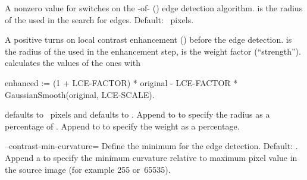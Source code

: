 \begin{codelist}
  \label{opt:contrast-edge-scale}%
\item[\itempar{--contrast-edge-scale=\metavar{EDGE-SCALE}\optional{:\feasiblebreak
      \metavar{LCE-SCALE}:\feasiblebreak\metavar{LCE-FACTOR}}}]\itemend
  A nonzero value for  switches on the
  \hyp{}of\hyp{} () edge detection
  algorithm.   is the radius of the  used in the search
  for edges.  Default: ~pixels.

  A positive  turns on local contrast enhancement () before the
   edge detection.   is the radius of the 
  used in the enhancement step,  is the weight factor (``strength'').
  \App{} calculates the  values of the  ones with

  \begin{adalisting}
enhanced :=
    (1 + LCE-FACTOR) * original -
    LCE-FACTOR * GaussianSmooth(original,
                                LCE-SCALE).
  \end{adalisting}

   defaults to ~pixels and 
  defaults to .  Append \sample{\%} to  to
  specify the radius as a percentage of .  Append \sample{\%} to
   to specify the weight as a percentage.


  \label{opt:contrast-min-curvature}%
\item[--contrast-min-curvature=\metavar{CURVATURE}]\itemend
  Define the minimum  for the  edge detection.  Default:
  .  Append a \sample{\%} to specify the minimum curvature
  relative to maximum pixel value in the source image (for example 255 or~65535).


\end{codelist}
